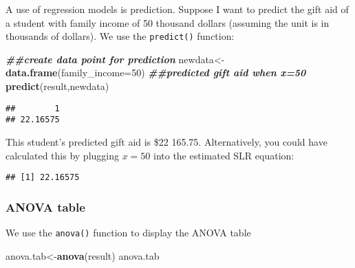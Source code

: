 \documentclass[
]{book}
\newenvironment{Shaded}{\begin{snugshade}}{\end{snugshade}}
\newcommand{\AttributeTok}[1]{\textcolor[rgb]{0.13,0.29,0.53}{#1}}
\newcommand{\DecValTok}[1]{\textcolor[rgb]{0.00,0.00,0.81}{#1}}
\newcommand{\DocumentationTok}[1]{\textcolor[rgb]{0.56,0.35,0.01}{\textbf{\textit{#1}}}}
\newcommand{\FunctionTok}[1]{\textcolor[rgb]{0.13,0.29,0.53}{\textbf{#1}}}
\newcommand{\NormalTok}[1]{#1}
\newcommand{\OtherTok}[1]{\textcolor[rgb]{0.56,0.35,0.01}{#1}}
\newcommand{\SpecialCharTok}[1]{\textcolor[rgb]{0.81,0.36,0.00}{\textbf{#1}}}
\begin{document}
A use of regression models is prediction. Suppose I want to predict the gift aid of a student with family income of 50 thousand dollars (assuming the unit is in thousands of dollars). We use the \texttt{predict()} function:

\begin{Shaded}
\begin{Highlighting}[]
\DocumentationTok{\#\#create data point for prediction}
\NormalTok{newdata}\OtherTok{\textless{}{-}}\FunctionTok{data.frame}\NormalTok{(}\AttributeTok{family\_income=}\DecValTok{50}\NormalTok{)}
\DocumentationTok{\#\#predicted gift aid when x=50}
\FunctionTok{predict}\NormalTok{(result,newdata)}
\end{Highlighting}
\end{Shaded}

\begin{verbatim}
##        1 
## 22.16575
\end{verbatim}

This student's predicted gift aid is \$22 165.75. Alternatively, you could have calculated this by plugging \(x=50\) into the estimated SLR equation:

\begin{Shaded}
\end{Shaded}

\begin{verbatim}
## [1] 22.16575
\end{verbatim}

\hypertarget{anova-table-1}{%
\subsubsection*{ANOVA table}\label{anova-table-1}}

We use the \texttt{anova()} function to display the ANOVA table

\begin{Shaded}
\begin{Highlighting}[]
\NormalTok{anova.tab}\OtherTok{\textless{}{-}}\FunctionTok{anova}\NormalTok{(result)}
\NormalTok{anova.tab}
\end{Highlighting}
\end{Shaded}
\end{document}
